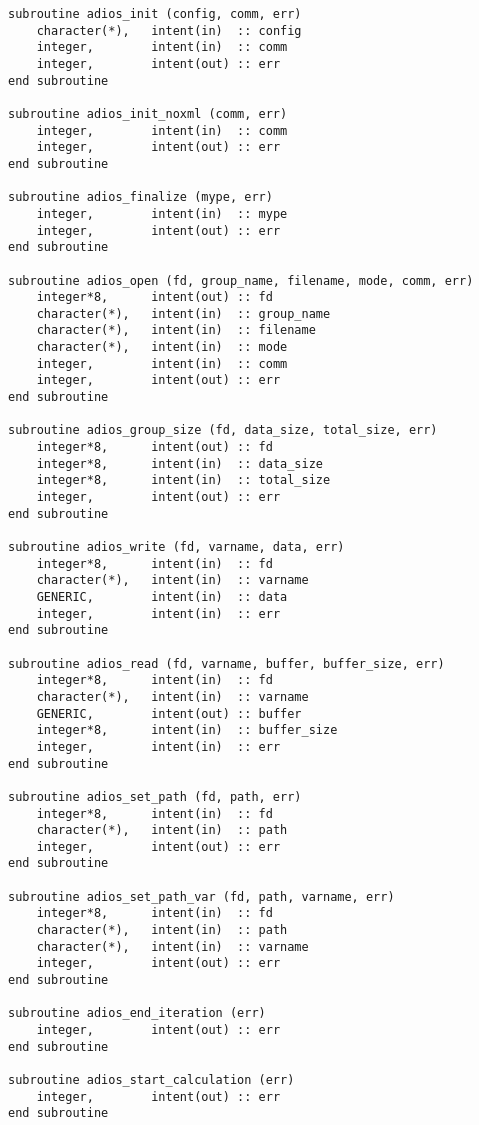 \begin{lstlisting}[language=ADIOS,alsolanguage=Fortran]
subroutine adios_init (config, comm, err)
    character(*),   intent(in)  :: config
    integer,        intent(in)  :: comm
    integer,        intent(out) :: err
end subroutine

subroutine adios_init_noxml (comm, err)
    integer,        intent(in)  :: comm
    integer,        intent(out) :: err
end subroutine

subroutine adios_finalize (mype, err)
    integer,        intent(in)  :: mype
    integer,        intent(out) :: err
end subroutine

subroutine adios_open (fd, group_name, filename, mode, comm, err)
    integer*8,      intent(out) :: fd
    character(*),   intent(in)  :: group_name
    character(*),   intent(in)  :: filename
    character(*),   intent(in)  :: mode
    integer,        intent(in)  :: comm
    integer,        intent(out) :: err
end subroutine

subroutine adios_group_size (fd, data_size, total_size, err)
    integer*8,      intent(out) :: fd
    integer*8,      intent(in)  :: data_size
    integer*8,      intent(in)  :: total_size
    integer,        intent(out) :: err
end subroutine

subroutine adios_write (fd, varname, data, err)
    integer*8,      intent(in)  :: fd
    character(*),   intent(in)  :: varname
    GENERIC,        intent(in)  :: data
    integer,        intent(in)  :: err 
end subroutine

subroutine adios_read (fd, varname, buffer, buffer_size, err)
    integer*8,      intent(in)  :: fd
    character(*),   intent(in)  :: varname
    GENERIC,        intent(out) :: buffer
    integer*8,      intent(in)  :: buffer_size 
    integer,        intent(in)  :: err 
end subroutine

subroutine adios_set_path (fd, path, err)
    integer*8,      intent(in)  :: fd
    character(*),   intent(in)  :: path
    integer,        intent(out) :: err
end subroutine

subroutine adios_set_path_var (fd, path, varname, err)
    integer*8,      intent(in)  :: fd
    character(*),   intent(in)  :: path
    character(*),   intent(in)  :: varname
    integer,        intent(out) :: err
end subroutine

subroutine adios_end_iteration (err)
    integer,        intent(out) :: err
end subroutine

subroutine adios_start_calculation (err)
    integer,        intent(out) :: err
end subroutine


\end{lstlisting}
